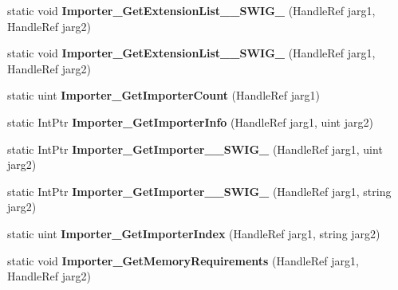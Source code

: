 \begin{DoxyCompactItemize}
\item 
\hypertarget{class_assimp_p_i_n_v_o_k_e_a88c1a7ca9f0b661553de21c8c64e29d9}{static void {\bfseries Importer\+\_\+\+Get\+Extension\+List\+\_\+\+\_\+\+S\+W\+I\+G\+\_} (Handle\+Ref jarg1, Handle\+Ref jarg2)}\label{class_assimp_p_i_n_v_o_k_e_a88c1a7ca9f0b661553de21c8c64e29d9}

\item 
\hypertarget{class_assimp_p_i_n_v_o_k_e_a4e3de439816a3f039e3d17a07bcfae28}{static void {\bfseries Importer\+\_\+\+Get\+Extension\+List\+\_\+\+\_\+\+S\+W\+I\+G\+\_} (Handle\+Ref jarg1, Handle\+Ref jarg2)}\label{class_assimp_p_i_n_v_o_k_e_a4e3de439816a3f039e3d17a07bcfae28}

\item 
\hypertarget{class_assimp_p_i_n_v_o_k_e_a1af4397124e59d90fc0d270a1bf1f122}{static uint {\bfseries Importer\+\_\+\+Get\+Importer\+Count} (Handle\+Ref jarg1)}\label{class_assimp_p_i_n_v_o_k_e_a1af4397124e59d90fc0d270a1bf1f122}

\item 
\hypertarget{class_assimp_p_i_n_v_o_k_e_a79d8f86c23137b69613a8a4593deceed}{static Int\+Ptr {\bfseries Importer\+\_\+\+Get\+Importer\+Info} (Handle\+Ref jarg1, uint jarg2)}\label{class_assimp_p_i_n_v_o_k_e_a79d8f86c23137b69613a8a4593deceed}

\item 
\hypertarget{class_assimp_p_i_n_v_o_k_e_a380a06b347840671922ba33ad814b61e}{static Int\+Ptr {\bfseries Importer\+\_\+\+Get\+Importer\+\_\+\+\_\+\+S\+W\+I\+G\+\_} (Handle\+Ref jarg1, uint jarg2)}\label{class_assimp_p_i_n_v_o_k_e_a380a06b347840671922ba33ad814b61e}

\item 
\hypertarget{class_assimp_p_i_n_v_o_k_e_a841395db02cd5f5d5c51c9f8cfe7e0d1}{static Int\+Ptr {\bfseries Importer\+\_\+\+Get\+Importer\+\_\+\+\_\+\+S\+W\+I\+G\+\_} (Handle\+Ref jarg1, string jarg2)}\label{class_assimp_p_i_n_v_o_k_e_a841395db02cd5f5d5c51c9f8cfe7e0d1}

\item 
\hypertarget{class_assimp_p_i_n_v_o_k_e_a8d4665e19223c6670555c2ecdafa2292}{static uint {\bfseries Importer\+\_\+\+Get\+Importer\+Index} (Handle\+Ref jarg1, string jarg2)}\label{class_assimp_p_i_n_v_o_k_e_a8d4665e19223c6670555c2ecdafa2292}

\item 
\hypertarget{class_assimp_p_i_n_v_o_k_e_ae965b32e984cdd7a532ebbf59a607d7d}{static void {\bfseries Importer\+\_\+\+Get\+Memory\+Requirements} (Handle\+Ref jarg1, Handle\+Ref jarg2)}\label{class_assimp_p_i_n_v_o_k_e_ae965b32e984cdd7a532ebbf59a607d7d}


\end{DoxyCompactItemize}
